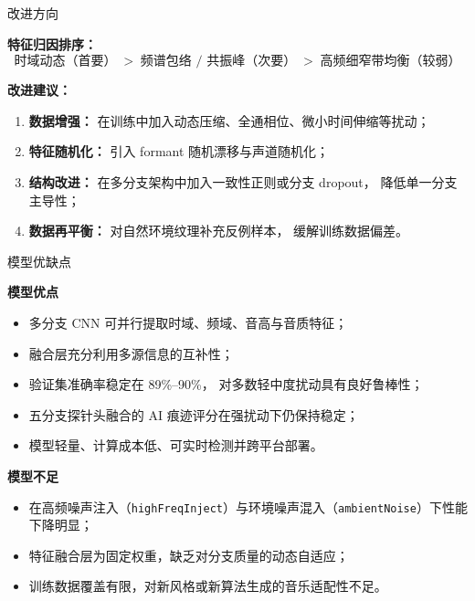 \documentclass[aspectratio=169]{beamer}
\providecommand{\paragraph}[1]{\smallskip\textbf{#1}\par}
\begin{document}
\begin{frame}{改进方向}

\textbf{特征归因排序：}
\[
\text{时域动态（首要）} \; > \;
\text{频谱包络 / 共振峰（次要）} \; > \;
\text{高频细窄带均衡（较弱）}
\]

\vspace{0.6em}
\textbf{改进建议：}
\begin{enumerate}
  \item \textbf{数据增强：}  
        在训练中加入动态压缩、全通相位、微小时间伸缩等扰动；
  \item \textbf{特征随机化：}  
        引入 formant 随机漂移与声道随机化；
  \item \textbf{结构改进：}  
        在多分支架构中加入一致性正则或分支 dropout，
        降低单一分支主导性；
  \item \textbf{数据再平衡：}  
        对自然环境纹理补充反例样本，
        缓解训练数据偏差。
\end{enumerate}

\end{frame}

\begin{frame}{模型优缺点}

\small
\paragraph{模型优点}
\begin{itemize}
  \item 多分支 CNN 可并行提取时域、频域、音高与音质特征；
  \item 融合层充分利用多源信息的互补性；
  \item 验证集准确率稳定在 89\%--90\%，
        对多数轻中度扰动具有良好鲁棒性；
  \item 五分支探针头融合的 AI 痕迹评分在强扰动下仍保持稳定；
  \item 模型轻量、计算成本低、可实时检测并跨平台部署。
\end{itemize}

\vspace{0.6em}
\paragraph{模型不足}
\begin{itemize}
  \item 在高频噪声注入（\texttt{highFreqInject}）与环境噪声混入（\texttt{ambientNoise}）下性能下降明显；
  \item 特征融合层为固定权重，缺乏对分支质量的动态自适应；
  \item 训练数据覆盖有限，对新风格或新算法生成的音乐适配性不足。
\end{itemize}

\end{frame}
\end{document}

